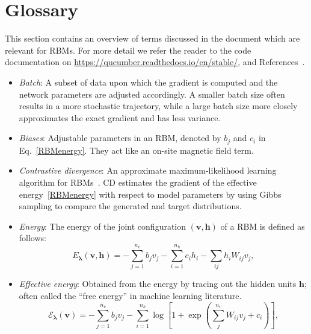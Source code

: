 \documentclass[submission, Phys, hidelnks]{SciPost}
\begin{document}
\appendix

\section{Glossary}\label{Glossary}
This section contains an overview of terms discussed in the document which are
relevant for RBMs. For more detail we refer the reader to the code documentation
on \url{https://qucumber.readthedocs.io/en/stable/}, and
References~\cite{hinton2002training, hinton2012practical}.

\begin{itemize}

\item \textit{Batch}: A subset of data upon which the gradient is computed and
the network parameters are adjusted accordingly. A smaller batch size often
results in a more stochastic trajectory, while a large batch size more closely
approximates the exact gradient and has less variance.

\item \textit{Biases}: Adjustable parameters in an RBM, denoted by $b_j$ and
$c_i$ in Eq.~\eqref{RBMenergy}. They act like an on-site magnetic field term.

\item \textit{Contrastive divergence}: An approximate maximum-likelihood
learning algorithm for RBMs~\cite{hinton2002training}. CD estimates the
gradient of the effective energy~\eqref{RBMenergy} with respect to model
parameters by using Gibbs sampling to compare the generated and target
distributions.

\item \textit{Energy}: The energy of the joint configuration $(\bm{v}, \bm{h})$
of a RBM is defined as follows:
\begin{equation}
   E_{\bm{\lambda}}(\bm{v},\bm{h}) = - \sum\limits_{j=1}^{n_v} b_j v_j - \sum\limits_{i=1}^{n_h} c_i h_i - \sum\limits_{ij} h_i W_{ij} v_j, \label{RBMenergy}
\end{equation}

\item \textit{Effective energy}: Obtained from the energy by tracing out the
hidden units $\bm{h}$; often called the ``free energy'' in machine learning
literature.
\begin{equation}
   \mathcal{E}_{\bm{\lambda}}(\bm{v}) = - \sum\limits_{j=1}^{n_v} b_j v_j - \sum\limits_{i=1}^{n_h} \log \left[ 1 + \exp \left( \sum\limits_{j}^{n_v} W_{ij}v_j +c_i\right) \right], \label{RBMeffectiveenergy}
\end{equation}


\end{itemize}
\end{document}
